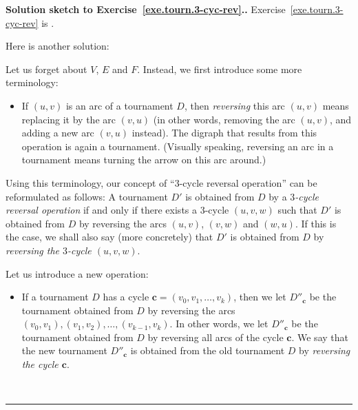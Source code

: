 \documentclass[numbers=enddot,12pt,final,onecolumn,notitlepage]{scrartcl}%
\theoremstyle{definition}
\newenvironment{proof}[1][Proof]{\noindent\textbf{#1.} }{\ \rule{0.5em}{0.5em}}
\newcommand{\tup}[1]{\left( #1 \right)}
\begin{document}
\begin{proof}[Solution sketch to Exercise~\ref{exe.tourn.3-cyc-rev}.]
Exercise~\ref{exe.tourn.3-cyc-rev} is
\cite[Theorem 35]{Moon13}.

Here is another solution:

Let us forget about $V$, $E$ and $F$. Instead, we first introduce
some more terminology:
\begin{itemize}
\item If $\tup{u, v}$ is an arc
of a tournament $D$, then \textit{reversing} this arc $\tup{u, v}$
means
replacing it by the arc $\tup{v, u}$ (in other words, removing the arc
$\tup{u, v}$, and adding a new arc $\tup{v, u}$ instead). The digraph
that results from this operation is again a tournament.
(Visually speaking, reversing an arc in a tournament means turning the
arrow on this arc around.)
\end{itemize}

Using this terminology, our concept of ``$3$-cycle reversal
operation'' can be reformulated as follows: A tournament $D'$ is
obtained from $D$ by a
\textit{$3$-cycle reversal operation} if and only if there exists a
$3$-cycle $\tup{u, v, w}$ such that $D'$ is obtained from $D$ by
reversing the arcs $\tup{u, v}$, $\tup{v, w}$ and $\tup{w, u}$.
If this is the case, we shall also say (more concretely) that $D'$ is
obtained from $D$ by \textit{reversing the $3$-cycle $\tup{u, v, w}$}.

Let us introduce a new operation:
\begin{itemize}
\item If a tournament $D$ has a
cycle $\mathbf{c} = \tup{v_0, v_1, \ldots, v_k}$, then we let
$D''_{\mathbf{c}}$ be the tournament obtained from $D$ by reversing
the arcs $\tup{v_0, v_1}, \tup{v_1, v_2}, \ldots, \tup{v_{k-1}, v_k}$.
In other words, we let $D''_{\mathbf{c}}$ be the tournament obtained
from $D$ by reversing all arcs of the cycle $\mathbf{c}$.
We say that the new tournament $D''_{\mathbf{c}}$ is obtained
from the old tournament $D$ by
\textit{reversing the cycle $\mathbf{c}$}.
\end{itemize}


\end{proof}
\end{document}
